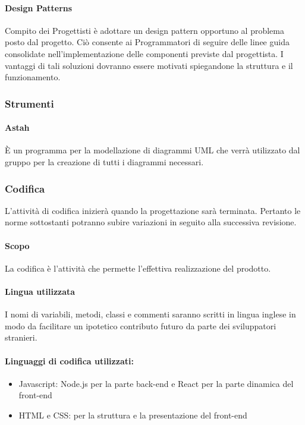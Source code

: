 \documentclass[11pt,a4paper]{article}
\begin{document}
{	\paragraph{Design Patterns\\} 
	Compito dei Progettisti è adottare un design pattern opportuno al problema posto dal progetto. Ciò consente ai Programmatori di seguire delle linee guida consolidate nell'implementazione delle componenti previste dal progettista. I vantaggi di tali soluzioni dovranno essere motivati spiegandone la struttura e il funzionamento.
	\subsubsection{Strumenti}
	\paragraph{Astah\\}
	È un programma per la modellazione di diagrammi UML che verrà utilizzato dal gruppo per la creazione di tutti i diagrammi necessari.
	
	\subsubsection{Codifica}
	L'attività di codifica inizierà quando la progettazione sarà terminata. Pertanto le norme sottostanti potranno subire variazioni in seguito alla successiva revisione.
	

	\paragraph{Scopo}
	La codifica è l'attività che permette l'effettiva realizzazione del prodotto.
		
	\paragraph{Lingua utilizzata}
 
	I nomi di variabili, metodi, classi e commenti saranno scritti in lingua inglese in modo da facilitare un ipotetico contributo futuro da parte dei sviluppatori stranieri.
	
	\paragraph{Linguaggi di codifica utilizzati:}
	\begin{itemize}
		\item Javascript: Node.js per la parte back-end e React per la parte dinamica del front-end
		\item HTML e CSS: per la struttura e la presentazione del front-end
	\end{itemize}
	
}
\end{document}
